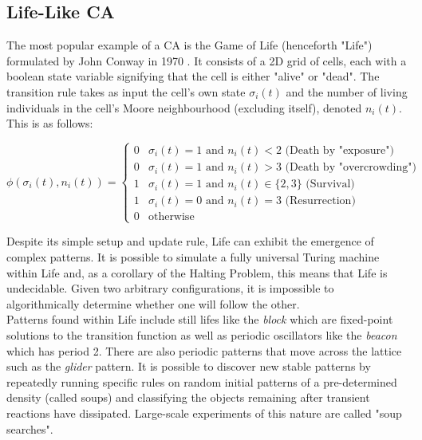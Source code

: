 \subsection{Life-Like CA} \label{sub:life}
The most popular example of a CA is the Game of Life (henceforth "Life") formulated by John Conway in 1970 \cite{gardner1970fantastic}. It consists of a 2D grid of cells, each with a boolean state variable signifying that the cell is either "alive" or "dead". The transition rule takes as input the cell's own state $\sigma_i(t)$ and the number of living individuals in the cell's Moore neighbourhood (excluding itself), denoted $n_i(t)$. This is as follows:

\begin{equation}
  \phi(\sigma_i(t), n_i(t)) = 
\begin{cases}
  0 & \sigma_i(t) = 1 \text{ and } n_i(t) < 2 \text{  (Death by "exposure")}\\
  0 & \sigma_i(t) = 1 \text{ and } n_i(t) > 3 \text{  (Death by "overcrowding")}\\
  1 & \sigma_i(t) = 1 \text{ and } n_i(t) \in \{2,3\} \text{  (Survival)}\\
  1 & \sigma_i(t) = 0 \text{ and } n_i(t) = 3 \text{  (Resurrection)}\\
  0 & \text{otherwise}
\end{cases}
\end{equation}

Despite its simple setup and update rule, Life can exhibit the emergence of complex patterns. It is possible to simulate a fully universal Turing machine within Life\cite{rendell} and, as a corollary of the Halting Problem, this means that Life is undecidable. Given two arbitrary configurations, it is impossible to algorithmically determine whether one will follow the other.\\

Patterns found within Life include still lifes like the \textit{block} which are fixed-point solutions to the transition function as well as periodic oscillators like the \textit{beacon} which has period 2. There are also periodic patterns that move across the lattice such as the \textit{glider} pattern. It is possible to discover new stable patterns by repeatedly running specific rules on random initial patterns of a pre-determined density (called soups) and classifying the objects remaining after transient reactions have dissipated. Large-scale experiments of this nature are called "soup searches"\cite{flammenkamp}.\\

